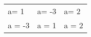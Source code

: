 \documentclass[11pt]{article}
\begin{document}
\begin{center}
\begin{tabular}{lll}
a\footnotemark = 1 & a\footnotemark = -3 & a\footnotemark = 2\\
a\footnotemark[1]{} = -3 & a\footnotemark[2]{} = 1 & a\footnotemark[3]{} = 2\\
\end{tabular}
\end{center}
\end{document}
